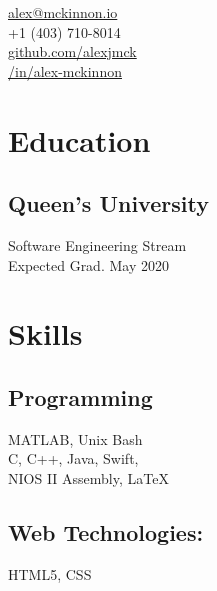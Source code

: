 \documentclass[]{hieudo-build}
\begin{document}
%
%
{
	\faEnvelope \href{mailto:alex@mckinnon.io}{ alex@mckinnon.io}\\
	\faPhone \thinspace +1 (403) 710-8014\\
	\faGithub \href{https://github.com/alexjmck}{   github.com/alexjmck}\\
	\faLinkedinSquare \href{https://www.linkedin.com/in/alex-mckinnon}{   /in/alex-mckinnon}
}
    
%
%
\begin{minipage}[t]{0.34\textwidth} 

\section{Education} 

\subsection{Queen's University}
Software Engineering Stream \\
Expected Grad. May 2020 \\
\sectionsep

\section{Skills}
\subsection{Programming}
MATLAB, Unix Bash\\ 
C, C++, Java, Swift,\\
NIOS II Assembly, \LaTeX

\subsection{Web Technologies:}
HTML5, CSS \\


\end{minipage}
\end{document}
